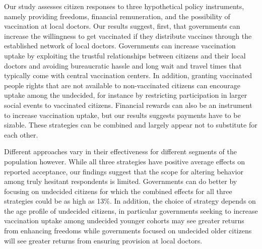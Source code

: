 \documentclass[12pt]{article}
\renewcommand\hl[1]{#1}
\begin{document}
Our study assesses citizen responses to three hypothetical policy instruments, namely providing freedoms, financial remuneration, and the possibility of vaccination at local doctors. Our results suggest, first, that governments can increase the willingness to get vaccinated if they distribute vaccines through the established  network of local doctors. Governments can increase vaccination uptake by exploiting the trustful relationships between citizens and their local doctors and avoiding bureaucratic hassle and long wait and travel times that typically come with central vaccination centers. In addition, granting vaccinated people rights that are not available to non-vaccinated citizens can encourage uptake among the undecided, for instance by restricting participation in larger social events to vaccinated citizens. Financial rewards can also be an instrument to increase vaccination uptake, but our results suggests payments have to be sizable. These strategies can be combined and largely appear not to substitute for each other. 

\hl{Different approaches vary in their effectiveness for different segments of the population however. While all three strategies have positive average effects on reported acceptance,  our findings suggest that the scope for altering behavior among truly hesitant respondents is limited. Governments can do better by focusing on undecided citizens for which the combined effects for all three strategies could be as high as 13\%. In addition, the choice of strategy depends on the age profile of undecided citizens, in particular governments seeking to increase vaccination uptake among undecided younger cohorts may see greater returns from enhancing freedoms while governments focused on undecided older citizens will see greater returns from ensuring provision at local doctors.} 







\end{document}
